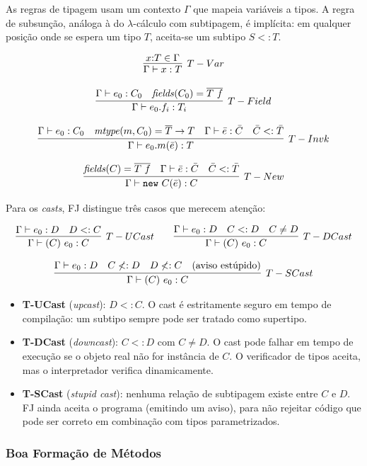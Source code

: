 As regras de tipagem usam um contexto \(\Gamma\) que mapeia variáveis
a tipos. A regra de subsunção, análoga à do $\lambda$-cálculo com
subtipagem, é implícita: em qualquer posição onde se espera um tipo
\(T\), aceita-se um subtipo \(S <: T\).

\[ \infer[T-Var]{\Gamma \vdash x : T}{x {:} T \in \Gamma} \]

\[ \infer[T-Field]{\Gamma \vdash e_0.f_i : T_i}{\Gamma \vdash e_0 : C_0 \quad
\mathit{fields}(C_0) = \overline{T\ f}} \]

\[ \infer[T-Invk]{\Gamma \vdash e_0.m(\bar{e}) : T}{\Gamma \vdash e_0 : C_0
    \quad \mathit{mtype}(m, C_0) = \overline{T} \to T \quad \Gamma
    \vdash \bar{e} :
\bar{C} \quad \bar{C} <: \bar{T}} \]

\[ \infer[T-New]{\Gamma \vdash \mathtt{new}\ C(\bar{e}) : C}{\mathit{fields}(C)
    = \overline{T\ f} \quad \Gamma \vdash \bar{e} : \bar{C} \quad \bar{C} <:
\bar{T}} \]

Para os \emph{casts}, FJ distingue três casos que merecem atenção:

\[ \infer[T-UCast]{\Gamma \vdash (C)\ e_0 : C}{\Gamma \vdash e_0 : D \quad D <:
  C} \qquad \infer[T-DCast]{\Gamma \vdash (C)\ e_0 : C}{\Gamma \vdash e_0 : D
\quad C <: D \quad C \neq D} \]

\[ \infer[T-SCast]{\Gamma \vdash (C)\ e_0 : C}{\Gamma \vdash e_0 : D \quad C
\not<: D \quad D \not<: C \quad \text{(aviso estúpido)}} \]

\begin{itemize}
  \item
    \textbf{T-UCast} (\emph{upcast}): \(D <: C\). O cast é
    estritamente seguro em tempo de compilação: um subtipo sempre
    pode ser tratado como supertipo.
  \item
    \textbf{T-DCast} (\emph{downcast}): \(C <: D\) com \(C \neq D\).
    O cast pode falhar em tempo de execução se o objeto real não for
    instância de \(C\). O verificador de tipos aceita, mas o
    interpretador verifica dinamicamente.
  \item
    \textbf{T-SCast} (\emph{stupid cast}): nenhuma relação de
    subtipagem existe entre \(C\) e \(D\). FJ ainda aceita o programa
    (emitindo um aviso), para não rejeitar código que pode ser
    correto em combinação com tipos parametrizados.
\end{itemize}

\subsubsection{Boa Formação de Métodos}

